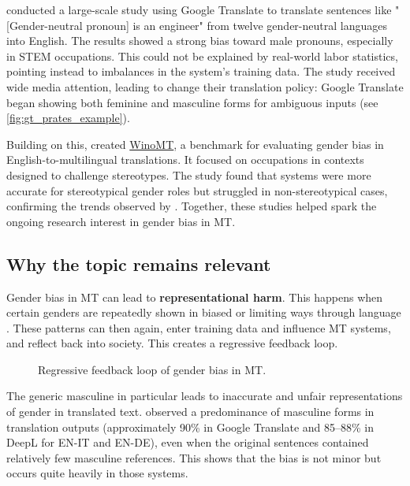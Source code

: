     \textbf{\citet{pratesAssessingGenderBias2019}} conducted a large-scale study using Google Translate to translate sentences like "[Gender-neutral pronoun] is an engineer" from twelve gender-neutral languages into English. The results showed a strong bias toward male pronouns, especially in STEM occupations. This could not be explained by real-world labor statistics, pointing instead to imbalances in the system's training data. The study received wide media attention, leading \citeauthor{googleReducingGenderBias2018} to change their translation policy: Google Translate began showing both feminine and masculine forms for ambiguous inputs \citep{googleReducingGenderBias2018} (see \autoref{fig:gt_prates_example}).

    Building on this, \textbf{\citet{stanovskyEvaluatingGenderBias2019}} created \href{https://github.com/gabrielStanovsky/mt_gender}{WinoMT}, a benchmark for evaluating gender bias in English-to-multilingual translations. It focused on occupations in contexts designed to challenge stereotypes. The study found that systems were more accurate for stereotypical gender roles but struggled in non-stereotypical cases, confirming the trends observed by \citeauthor{pratesAssessingGenderBias2019}.
    Together, these studies helped spark the ongoing research interest in gender bias in MT.

\subsection{Why the topic remains relevant }
    Gender bias in MT can lead to \textbf{representational harm}. This happens when certain genders are repeatedly shown in biased or limiting ways through language \citep{stanczakSurveyGenderBias2021}. These patterns can then again, enter training data and influence MT systems, and reflect back into society. This creates a regressive feedback loop.

    \vspace{1cm} 
    \begin{figure}[htb]
        \centering
        \scalebox{0.8}{}
        \caption{Regressive feedback loop of gender bias in MT.}
        \label{fig:regressive_feedback_loop}
    \end{figure}
    \vspace{1cm} 

    The generic masculine in particular leads to inaccurate and unfair representations of gender in translated text. \citet{rescignoGenderBiasMachine2023} observed a predominance of masculine forms in translation outputs (approximately 90\% in Google Translate and 85–88\% in DeepL for EN-IT and EN-DE), even when the original sentences contained relatively few masculine references. This shows that the bias is not minor but occurs quite heavily in those systems.

